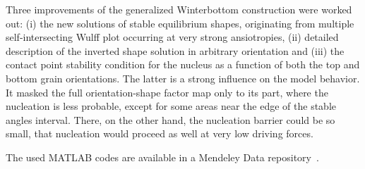 Three improvements of the generalized Winterbottom construction were worked out: (i) the new solutions of stable equilibrium shapes, originating from multiple self-intersecting Wulff plot occurring at very strong ansiotropies, (ii) detailed description of the inverted shape solution in arbitrary orientation and (iii) the contact point stability condition for the nucleus as a function of both the top and bottom grain orientations. The latter is a strong influence on the model behavior. It masked the full orientation-shape factor map only to its part, where the nucleation is less probable, except for some areas near the edge of the stable angles interval. There, on the other hand, the nucleation barrier could be so small, that nucleation would proceed as well at very low driving forces. 


The used MATLAB codes are available in a Mendeley Data repository~\cite{Minar2023dataset}.


\cleardoublepage

